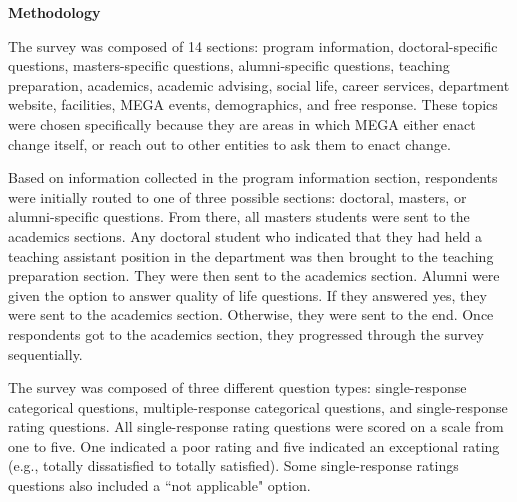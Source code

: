 \pagestyle{empty} %
\begin{center}
\textbf{Methodology}
\end{center}

\singlespacing
The survey was composed of 14 sections: program information, doctoral-specific questions, masters-specific questions, alumni-specific questions, teaching preparation, academics, academic advising, social life, career services, department website, facilities, MEGA events, demographics, and free response. These topics were chosen specifically because they are areas in which MEGA either enact change itself, or reach out to other entities to ask them to enact change.

Based on information collected in the program information section, respondents were initially routed to one of three possible sections: doctoral, masters, or alumni-specific questions. From there, all masters students were sent to the academics sections. Any doctoral student who indicated that they had held a teaching assistant position in the department was then brought to the teaching preparation section. They were then sent to the academics section. Alumni were given the option to answer quality of life questions. If they answered yes, they were sent to the academics section. Otherwise, they were sent to the end. Once respondents got to the academics section, they progressed through the survey sequentially.

The survey was composed of three different question types: single-response categorical questions, multiple-response categorical questions, and single-response rating questions. All single-response rating questions were scored on a scale from one to five. One indicated a poor rating and five indicated an exceptional rating (e.g., totally dissatisfied to totally satisfied). Some single-response ratings questions also included a ``not applicable" option.   
